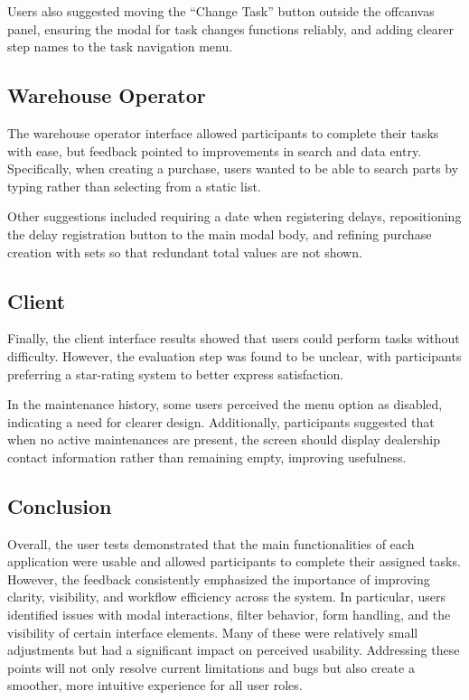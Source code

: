 Users also suggested moving the “Change Task” button outside the offcanvas panel, ensuring the modal for task changes functions reliably, and adding clearer step names to the task navigation menu.

\subsection{Warehouse Operator}

The warehouse operator interface allowed participants to complete their tasks with ease, but feedback pointed to improvements in search and data entry. Specifically, when creating a purchase, users wanted to be able to search parts by typing rather than selecting from a static list.

Other suggestions included requiring a date when registering delays, repositioning the delay registration button to the main modal body, and refining purchase creation with sets so that redundant total values are not shown.

\subsection{Client}

Finally, the client interface results showed that users could perform tasks without difficulty. However, the evaluation step was found to be unclear, with participants preferring a star-rating system to better express satisfaction.

In the maintenance history, some users perceived the menu option as disabled, indicating a need for clearer design. Additionally, participants suggested that when no active maintenances are present, the screen should display dealership contact information rather than remaining empty, improving usefulness.


\subsection{Conclusion}

Overall, the user tests demonstrated that the main functionalities of each application were usable and allowed participants to complete their assigned tasks. However, the feedback consistently emphasized the importance of improving clarity, visibility, and workflow efficiency across the system. In particular, users identified issues with modal interactions, filter behavior, form handling, and the visibility of certain interface elements. Many of these were relatively small adjustments but had a significant impact on perceived usability. Addressing these points will not only resolve current limitations and bugs but also create a smoother, more intuitive experience for all user roles.

